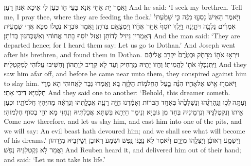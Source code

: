{וַאֲמַר יָת אַחַי אֲנָא בָּעֵי חַו כְּעַן לִי אֵיכָא אִנּוּן רָעַן׃}
{And he said: ‘I seek my brethren. Tell me, I pray thee, where they are feeding the flock.’}{}
{וַיֹּ֤אמֶר הָאִישׁ֙ נָסְע֣וּ מִזֶּ֔ה כִּ֤י שָׁמַ֙עְתִּי֙ אֹֽמְרִ֔ים נֵלְכָ֖ה דֹּתָ֑יְנָה וַיֵּ֤לֶךְ יוֹסֵף֙ אַחַ֣ר אֶחָ֔יו וַיִּמְצָאֵ֖ם בְּדֹתָֽן׃}
{וַאֲמַר גּוּבְרָא נְטַלוּ מִכָּא אֲרֵי שְׁמַעִית דְּאָמְרִין נֵיזֵיל לְדוֹתָן וַאֲזַל יוֹסֵף בָּתַר אֲחוֹהִי וְאַשְׁכְּחִנּוּן בְּדוֹתָן׃}
{And the man said: ‘They are departed hence; for I heard them say: Let us go to Dothan.’ And Joseph went after his brethren, and found them in Dothan.}{}
{וַיִּרְא֥וּ אֹת֖וֹ מֵרָחֹ֑ק וּבְטֶ֙רֶם֙ יִקְרַ֣ב אֲלֵיהֶ֔ם וַיִּֽתְנַכְּל֥וּ אֹת֖וֹ לַהֲמִיתֽוֹ׃}
{וַחֲזוֹ יָתֵיהּ מֵרַחִיק וְעַד לָא קְרֵיב לְוָתְהוֹן וְחַשִּׁיבוּ עֲלוֹהִי לְמִקְטְלֵיהּ׃}
{And they saw him afar off, and before he came near unto them, they conspired against him to slay him.}{}
{וַיֹּאמְר֖וּ אִ֣ישׁ אֶל\maqqaf אָחִ֑יו הִנֵּ֗ה בַּ֛עַל הַחֲלֹמ֥וֹת הַלָּזֶ֖ה בָּֽא׃}
{וַאֲמַרוּ גְּבַר לַאֲחוּהִי הָא מָרֵי חֶלְמַיָּא דֵּיכִי אָתֵי׃}
{And they said one to another: ‘Behold, this dreamer cometh.}{}
{וְעַתָּ֣ה \legarmeh  לְכ֣וּ וְנַֽהַרְגֵ֗הוּ וְנַשְׁלִכֵ֙הוּ֙ בְּאַחַ֣ד הַבֹּר֔וֹת וְאָמַ֕רְנוּ חַיָּ֥ה רָעָ֖ה אֲכָלָ֑תְהוּ וְנִרְאֶ֕ה מַה\maqqaf יִּהְי֖וּ חֲלֹמֹתָֽיו׃}
{וּכְעַן אֵיתוֹ וְנִקְטְלִנֵּיהּ וְנִרְמֵינֵיהּ בְּחַד מִן גּוּבַּיָּא וְנֵימַר חַיְתָא בִּשְׁתָּא אֲכַלְתֵּיהּ וְנִחְזֵי מָא יְהֵי בְסוֹף חֶלְמוֹהִי׃}
{Come now therefore, and let us slay him, and cast him into one of the pits, and we will say: An evil beast hath devoured him; and we shall see what will become of his dreams.’}{}
{וַיִּשְׁמַ֣ע רְאוּבֵ֔ן וַיַּצִּלֵ֖הוּ מִיָּדָ֑ם וַיֹּ֕אמֶר לֹ֥א נַכֶּ֖נּוּ נָֽפֶשׁ׃}
{וּשְׁמַע רְאוּבֵן וְשֵׁיזְבֵיהּ מִיַּדְהוֹן וַאֲמַר לָא נִקְטְלִנֵּיהּ נְפַשׁ׃}
{And Reuben heard it, and delivered him out of their hand; and said: ‘Let us not take his life.’}{}
